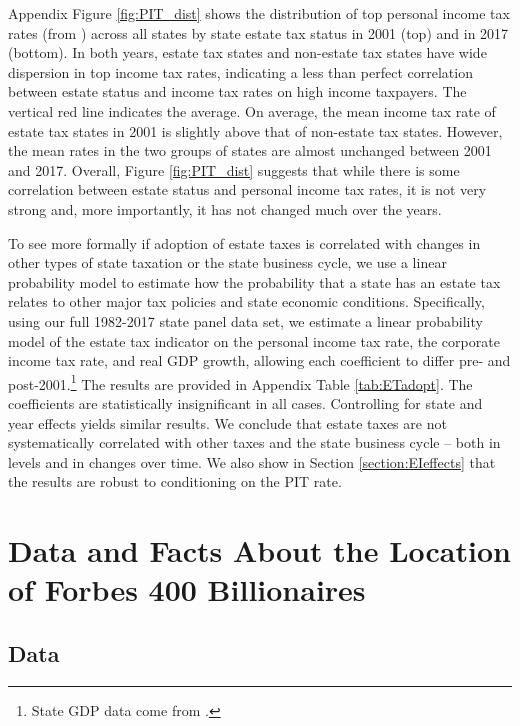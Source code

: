 \documentclass[12pt]{article}
\begin{document}
Appendix Figure \ref{fig:PIT_dist} shows the distribution of top personal income tax rates (from \cite{moretti/wilson:2017}) across all states by state estate tax status in 2001 (top) and in 2017 (bottom). In both years, estate tax states and non-estate tax states have wide dispersion in top income tax rates, indicating a less than perfect correlation between estate status and income tax rates on high income taxpayers. The vertical red line indicates the average. On average, the mean income tax rate of estate tax states in 2001 is slightly above that of non-estate tax states. However, the mean rates in the two groups of states are almost unchanged between 2001 and 2017. Overall, Figure \ref{fig:PIT_dist} suggests that while there is some correlation between estate status and personal income tax rates, it is not very strong and, more importantly, it has not changed much over the years. 

To see more formally if adoption of estate taxes is correlated with changes in other types of state taxation or the state business cycle, we use a linear probability model to estimate  how the probability that a state has an estate tax relates to other major tax policies and state economic conditions. Specifically, using our full 1982-2017 state panel data set, we estimate a linear probability model of the estate tax indicator on the personal income tax rate, the corporate income tax rate, and real GDP growth, allowing each coefficient to differ pre- and post-2001.\footnote{State GDP data come from \cite{stateGDP}.} The results are provided in Appendix Table \ref{tab:ETadopt}. The coefficients are statistically insignificant in all cases. Controlling for state and year effects yields similar results. We conclude that estate taxes are not systematically correlated with other taxes and the state business cycle -- both in levels and in changes over time. We also show in Section \ref{section:EIeffects} that the results are robust to conditioning on the PIT rate.  



\section{Data and Facts About the Location of Forbes 400 Billionaires}

\subsection{Data}
\end{document}

